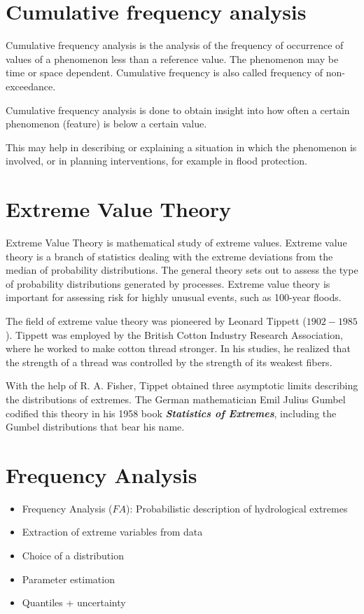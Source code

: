 \documentclass[12pt, a4paper]{article}
\theoremstyle{plain}
\theoremstyle{definition}
\theoremstyle{remark}
\begin{document}
\section{Cumulative frequency analysis}

Cumulative frequency analysis is the analysis of the frequency of occurrence of values of a phenomenon less than a reference value. The phenomenon may be time or space dependent. Cumulative frequency is also called frequency of non-exceedance.

Cumulative frequency analysis is done to obtain insight into how often a certain phenomenon (feature) is below a certain value.

This may help in describing or explaining a situation in which the phenomenon is involved, or in planning interventions, for example
in flood protection.


\section{Extreme Value Theory}
Extreme Value Theory is mathematical study of extreme values.
Extreme value theory is a branch of statistics dealing with the extreme deviations from the median of probability distributions. The general theory sets out to assess the type of probability distributions generated by processes. Extreme value theory is important for assessing risk for highly unusual events, such as 100-year floods.

The field of extreme value theory was pioneered by Leonard Tippett ($1902-1985$). Tippett was employed by the British Cotton Industry Research Association, where he worked to make cotton thread stronger. In his studies, he realized that the strength of a thread was controlled by the strength of its weakest fibers.

With the help of R. A. Fisher, Tippet obtained three asymptotic limits describing the distributions of extremes. The German mathematician Emil Julius Gumbel codified this theory in his 1958 book \textbf{\emph{Statistics of Extremes}}, including the Gumbel distributions that bear his name.
\section{Frequency Analysis}
\begin{itemize}
\item Frequency Analysis ($FA$): Probabilistic description of hydrological extremes
\item Extraction of extreme variables from data
\item Choice of a distribution
\item Parameter estimation
\item Quantiles + uncertainty
\end{itemize}
\end{document}
